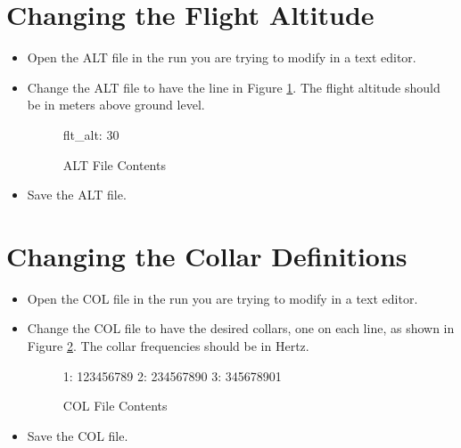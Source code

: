 \documentclass{report}
\begin{document}
	\section{Changing the Flight Altitude}
		\begin{itemize}
			\item Open the ALT file in the run you are trying to modify in a text editor.
			\item Change the ALT file to have the line in Figure \ref{lst:ALT_file}.  The flight altitude should be in meters above ground level.
				\begin{figure}[ht]
					\centering
					\caption{ALT File Contents}
					\label{lst:ALT_file}
					\begin{listing}{1}
flt_alt: 30\end{listing}
				\end{figure}
			\item Save the ALT file.
		\end{itemize}
	\section{Changing the Collar Definitions}
		\begin{itemize}
			\item Open the COL file  in the run you are trying to modify in a text editor.
			\item Change the COL file to have the desired collars, one on each line, as shown in Figure \ref{lst:COL_file}.  The collar frequencies should be in Hertz.
				\begin{figure}[ht]
					\centering
					\caption{COL File Contents}
					\label{lst:COL_file}
					\begin{listing}{1}
1: 123456789
2: 234567890
3: 345678901\end{listing}
				\end{figure}
			\item Save the COL file.
		\end{itemize}
\end{document}
